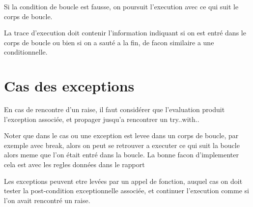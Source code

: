 \documentclass[a4paper,twoside]{article}
\begin{document}
Si la condition de boucle est fausse, on poursuit l'execution avec ce qui suit
le corps de boucle.

La trace d'execution doit contenir l'information indiquant si on est entré dans
le corps de boucle ou bien si on a sauté a la fin, de facon similaire a une
conditionnelle.


\section{Cas des exceptions}

En cas de rencontre d'un raise, il faut considérer que l'evaluation produit
l'exception associée, et propager jusqu'a rencontrer un try..with..

Noter que dans le cas ou une exception est levee dans un corps de boucle, par
exemple avec break, alors on peut se retrouver a executer ce qui suit la boucle
alors meme que l'on était entré dans la boucle. La bonne facon d'implementer
cela est avec les regles données dans le rapport~\cite{becker21rr}

Les exceptions peuvent etre levées par un appel de fonction, auquel cas on doit
tester la post-condition exceptionnelle associée, et continuer l'execution comme
si l'on avait rencontré un raise.




%

\end{document}
